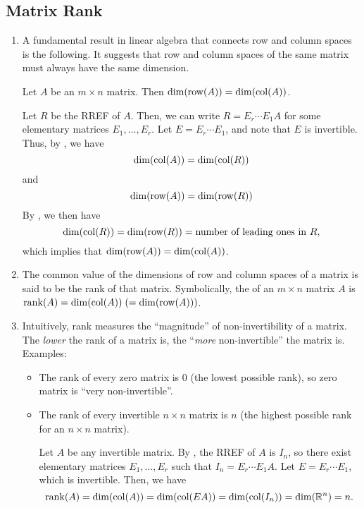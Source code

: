 \subsection{Matrix Rank}
\begin{enumerate}
\item A fundamental result in linear algebra that connects row and column
spaces is the following. It suggests that row and column spaces of the same
matrix must always have the same dimension.
\begin{theorem}
\label{thm:row-col-same-dim}
Let \(A\) be an \(m\times n\) matrix. Then \(\dim(\operatorname{row}(A))=\dim(\operatorname{col}(A))\).
\end{theorem}
\begin{pf}
Let \(R\) be the RREF of \(A\). Then, we can write \(R=E_r\dotsb E_1A\) for
some elementary matrices \(E_1,\dotsc,E_r\). Let \(E=E_r\dotsb E_1\), and note
that \(E\) is invertible. Thus, by
, we
have
\[
\dim(\operatorname{col}(A))=\dim(\operatorname{col}(R))
\]
and
\[
\dim(\operatorname{row}(A))=\dim(\operatorname{row}(R))
\]
By , we
then have
\[
\dim(\operatorname{col}(R))=\dim(\operatorname{row}(R))=\text{number of leading ones in \(R\)},
\]
which implies that \(\dim(\operatorname{row}(A))=\dim(\operatorname{col}(A))\).
\end{pf}
\item The common value of the dimensions of row and column spaces of a matrix
is said to be the rank of that matrix. Symbolically, the  of an
\(m\times n\) matrix \(A\) is \(\operatorname{rank}(A)=\dim(\operatorname{col}(A))\;(=\dim(\operatorname{row}(A)))\).

\item Intuitively, rank measures the ``magnitude'' of non-invertibility of a
matrix. The \emph{lower} the rank of a matrix is, the ``\emph{more}
non-invertible'' the matrix is. Examples:
\begin{itemize}
\item The rank of every zero matrix is \(0\) (the lowest possible rank), so
zero matrix is ``very non-invertible''.
\item The rank of every invertible \(n\times n\) matrix is \(n\) (the highest
possible rank for an \(n\times n\) matrix).

\begin{pf}
Let \(A\) be any invertible matrix. By , the
RREF of \(A\) is \(I_n\), so there exist elementary matrices \(E_1,\dotsc,E_r\)
such that \(I_n=E_r\dotsb E_1 A\). Let \(E=E_r\dotsb E_1\), which is
invertible. Then, we have
\[
\operatorname{rank}(A)=\dim(\operatorname{col}(A))
=\dim(\operatorname{col}(EA))
=\dim(\operatorname{col}(I_n))
=\dim(\mathbb{R}^n)
=n.
\]
\end{pf}


\end{itemize}
\end{enumerate}

